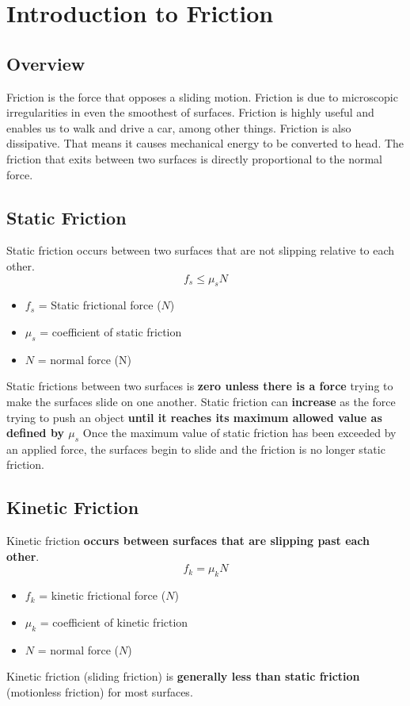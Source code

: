 \section{Introduction to Friction}
	
\subsection{Overview}
Friction is the force that opposes a sliding motion. Friction is due to microscopic irregularities in even the smoothest of surfaces. Friction is highly useful and enables us to walk and drive a car, among other things. Friction is also dissipative. That means it causes mechanical energy to be converted to head. The friction that exits between two surfaces is directly proportional to the normal force.
	
\subsection{Static Friction}
Static friction occurs between two surfaces that are not slipping relative to each other. \[f_s\leq\mu_sN\]
\begin{itemize}
	\item $f_s$ =  Static frictional force ($N$)
	\item $\mu_s$ = coefficient of static friction
	\item $N$ = normal force (N)
\end{itemize}
Static frictions between two surfaces is \textbf{zero unless there is a force} trying to make the surfaces slide on one another. Static friction can \textbf{increase} as the force trying to push an object \textbf{until it reaches its maximum allowed value as defined by $\mu_s$} Once the maximum value of static friction has been exceeded by an applied force, the surfaces begin to slide and the friction is no longer static friction.
	
\subsection{Kinetic Friction}
Kinetic friction \textbf{occurs between surfaces that are slipping past each other}. \[f_k=\mu_kN\]
\begin{itemize}
	\item $f_k$ = kinetic frictional force ($N$)
	\item $\mu_k$ = coefficient of kinetic friction
	\item $N$ = normal force ($N$)
\end{itemize}
Kinetic friction (sliding friction) is \textbf{generally less than static friction} (motionless friction) for most surfaces.